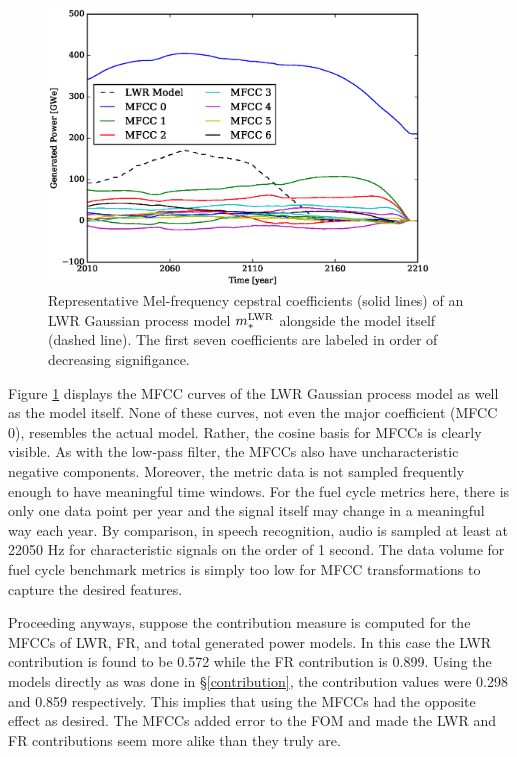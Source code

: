 \begin{figure}[htb]
\centering
\includegraphics[width=0.9\textwidth]{mfcc-lwr-model.eps}
\caption{Representative Mel-frequency cepstral coefficients (solid lines) of 
an LWR Gaussian process model $m_*^{\mathrm{LWR}}$ alongside the model itself (dashed 
line). The first seven coefficients are labeled in order of decreasing 
signifigance.}
\label{mfcc-lwr-model}
\end{figure}

Figure \ref{mfcc-lwr-model} displays the MFCC curves of the LWR Gaussian 
process model as well as the model itself. None of these curves, not even the 
major coefficient (MFCC 0), resembles the actual model.  Rather, the cosine basis for MFCCs
is clearly visible.  As with the low-pass filter, the MFCCs also have 
uncharacteristic negative components.  Moreover, 
the metric data is not sampled frequently enough to have meaningful
time windows. For the fuel cycle metrics here, there is only one data point per year 
and the signal itself may change in a meaningful way each year. By comparison, 
in speech recognition, audio is sampled at least at 22050 Hz for characteristic 
signals on the order of 1 second.  The data volume for fuel cycle benchmark metrics
is simply too low for MFCC transformations to capture the desired features. 

Proceeding anyways, suppose the contribution measure is computed for the MFCCs 
of LWR, FR, and 
total generated power models.  In this case the LWR contribution is found to be 
0.572 while the FR contribution is 0.899. Using the models directly as was done 
in \S\ref{contribution}, the contribution values were 0.298 and 0.859 respectively.
This implies that using the MFCCs had the opposite effect as desired.  The MFCCs
added error to the FOM and made the LWR and FR contributions seem more alike than 
they truly are.


